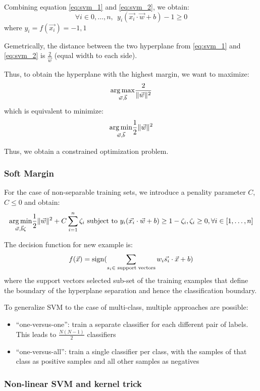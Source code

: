 Combining equation \ref{eq:svm_1} and \ref{eq:svm_2}, we obtain:
$$ \forall i \in {0, \ldots, n}, ~~ y_i (\vec{x_i} \cdot \vec{w} + b) - 1 \geq 0$$
where $y_i = f(\vec{x_i}) = {-1, 1}$

Gemetrically, the distance between the two hyperplane from \ref{eq:svm_1} and \ref{eq:svm_2} is $\frac{2}{\vec{w}}$ (equal width to each side).

Thus, to obtain the hyperplane with the highest margin, we want to maximize:
$$ \underset {\vec{w}, \vec{b}}{\operatorname {arg\,max}} \frac{2}{\lVert \vec{w} \rVert^2} $$
which is equivalent to minimize:
$$ \underset {\vec{w}, \vec{b}}{\operatorname {arg\,min}} \frac{1}{2} \lVert \vec{w} \rVert^2 $$

Thus, we obtain a constrained optimization problem.

\subsubsection{Soft Margin}

For the case of non-separable training sets, we introduce a penality parameter $C$, $C \leq 0$ and obtain:
$$
\underset {\vec{w}, \vec{b} \zeta}{\operatorname {arg\,min}} \frac{1}{2} \lVert \vec{w} \rVert^2 + C \sum_{i = 1}^{n} \zeta_i
\text{ subject to } y_i (\vec{x_i} \cdot \vec{w} + b) \geq 1 - \zeta_i, \zeta_i \geq 0, \forall i \in [1, \ldots, n]
$$

The decision function for new example is:
$$
f(\vec{x}) = \operatorname {sign} (\sum_{s_i \in \text{ support vectors}} w_i \vec{s_i} \cdot \vec{x} + b)
$$
where the support vectors selected sub-set of the training  examples that define the boundary of the hyperplane separation and hence the classification boundary.

To generalize SVM to the case of multi-class, multiple approaches are possible:
\begin{itemize}
    \item \enquote{one-versus-one}: train a separate classifier for each different pair of labels. This leads to $\frac{N (N - 1)}{2}$ classifiers
    \item \enquote{one-versus-all}: train a single classifier per class, with the samples of that class as positive samples and all other samples as negatives
\end{itemize}

\subsubsection{Non-linear SVM and kernel trick}

